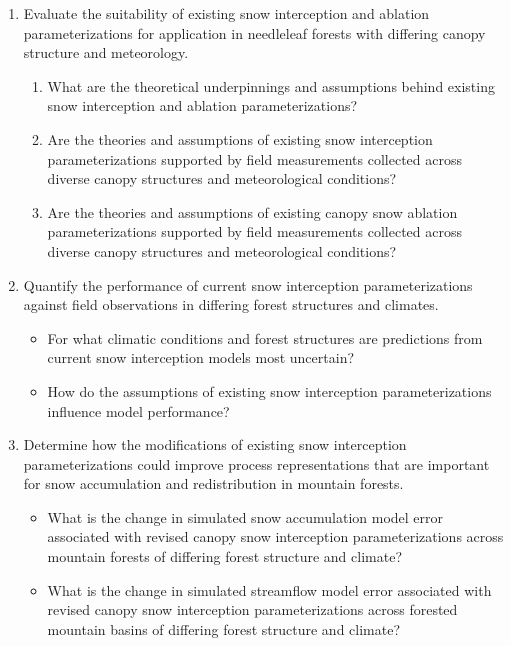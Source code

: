 \documentclass[
  letterpaper,
  DIV=11,
  numbers=noendperiod]{scrartcl}
\begin{document}
\begin{enumerate}
\def\labelenumi{\arabic{enumi}.}
\item
  Evaluate the suitability of existing snow interception and ablation
  parameterizations for application in needleleaf forests with differing
  canopy structure and meteorology.

  \begin{enumerate}
  \def\labelenumii{\alph{enumii}.}
  \item
    What are the theoretical underpinnings and assumptions behind
    existing snow interception and ablation parameterizations?
  \item
    Are the theories and assumptions of existing snow interception
    parameterizations supported by field measurements collected across
    diverse canopy structures and meteorological conditions?
  \item
    Are the theories and assumptions of existing canopy snow ablation
    parameterizations supported by field measurements collected across
    diverse canopy structures and meteorological conditions?
  \end{enumerate}
\item
  Quantify the performance of current snow interception
  parameterizations against field observations in differing forest
  structures and climates.

  \begin{itemize}
  \item
    For what climatic conditions and forest structures are predictions
    from current snow interception models most uncertain?
  \item
    How do the assumptions of existing snow interception
    parameterizations influence model performance?
  \end{itemize}
\item
  Determine how the modifications of existing snow interception
  parameterizations could improve process representations that are
  important for snow accumulation and redistribution in mountain
  forests.

  \begin{itemize}
  \item
    What is the change in simulated snow accumulation model error
    associated with revised canopy snow interception parameterizations
    across mountain forests of differing forest structure and climate?
  \item
    What is the change in simulated streamflow model error associated
    with revised canopy snow interception parameterizations across
    forested mountain basins of differing forest structure and climate?
  \end{itemize}
\end{enumerate}
\end{document}
